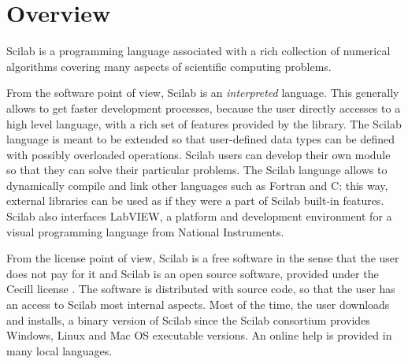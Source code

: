 %

\section{Overview}

Scilab is a programming language associated with a rich collection
of numerical algorithms covering many aspects of scientific computing 
problems. 

From the software point of view, Scilab is an \emph{interpreted} language.
This generally allows to get faster development processes, because the user
directly accesses to a high level language, with a rich set of 
features provided by the library.
The Scilab language is meant to be extended so that user-defined data types
can be defined with possibly overloaded operations.
Scilab users can develop their own module so that they can 
solve their particular problems.
The Scilab language allows to dynamically compile and link other languages such 
as Fortran and C: this way, external libraries can be used as if they were 
a part of Scilab built-in features. Scilab also interfaces LabVIEW, 
a platform and development environment for a visual programming language 
from National Instruments.

From the license point of view, Scilab is a free software in the sense that the user does not 
pay for it and Scilab is an open source software, provided under the Cecill
license \cite{CecillLicence}. The software is distributed with source code, so that the user
has an access to Scilab most internal aspects. Most of the time, 
the user downloads and installs, a binary version of Scilab since the Scilab consortium  
provides Windows, Linux and Mac OS executable versions. An online help is provided 
in many local languages.

